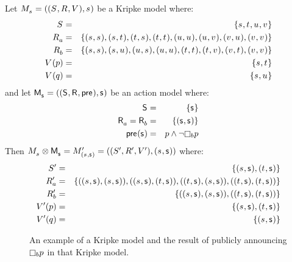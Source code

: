 \begin{example}\label{example-pal}
Let $\kPModelAndTuple{\kStateS}$ be a Kripke model where:
\begin{eqnarray*}
    \kStates &=& \{\kStateS, \kStateT, \kStateU, \kStateV\}\\
    \kAccessibilityA &=& \{(\kStateS, \kStateS), (\kStateS, \kStateT), (\kStateT, \kStateS), (\kStateT, \kStateT), (\kStateU, \kStateU), (\kStateU, \kStateV), (\kStateV, \kStateU), (\kStateV, \kStateV)\}\\
    \kAccessibilityB &=& \{(\kStateS, \kStateS), (\kStateS, \kStateU), (\kStateU, \kStateS), (\kStateU, \kStateU), (\kStateT, \kStateT), (\kStateT, \kStateV), (\kStateV, \kStateT), (\kStateV, \kStateV)\}\\
    \kValuation(\atomP) &=& \{\kStateS, \kStateT\}\\
    \kValuation(\atomQ) &=& \{\kStateS, \kStateU\}
\end{eqnarray*}
and let $\aPModelAndTuple{\aStateS}$ be an action model where:
\begin{eqnarray*}
    \aStates &=& \{\aStateS\}\\
    \aAccessibilityA = \aAccessibilityB &=& \{(\aStateS, \aStateS)\}\\\
    \aPrecondition(\aStateS) &=& \atomP \land \lnot \knowsB \atomP
\end{eqnarray*}
Then $\kPModel{\kStateS} \exec \aPModel{\aStateS} = \kPModelAndTupleP{(\kStateS, \aStateS)}$ where:
\begin{eqnarray*}
    \kStatesP &=& \{(\kStateS, \aStateS), (\kStateT, \aStateS)\}\\
    \kAccessibilityPA &=& \{((\kStateS, \aStateS), (\kStateS, \aStateS)), ((\kStateS, \aStateS), (\kStateT, \aStateS)), ((\kStateT, \aStateS), (\kStateS, \aStateS)), ((\kStateT, \aStateS), (\kStateT, \aStateS))\}\\
    \kAccessibilityPB &=& \{((\kStateS, \aStateS), (\kStateS, \aStateS)), ((\kStateT, \aStateS), (\kStateT, \aStateS))\}\\
    \kValuationP(\atomP) &=& \{(\kStateS, \aStateS), (\kStateT, \aStateS)\}\\
    \kValuationP(\atomQ) &=& \{(\kStateS, \aStateS)\}
\end{eqnarray*}

\begin{figure}[b!]
    \caption{An example of a Kripke model and the result of publicly announcing $\knowsB \atomP$ in that Kripke model.}\label{example-pal-figure}
    \centering
    \begin{tikzpicture}[>=stealth',shorten >=1pt,auto,node distance=7em,thick]


\end{tikzpicture}
\end{figure}
\end{example}
